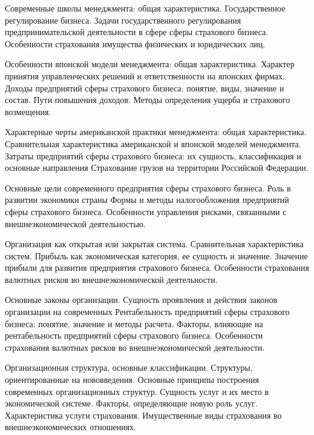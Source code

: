 \documentclass[
	11pt,
	a4paper,
	]
	{article}
\begin{document}
\bigskip

\noindent{} 
	{
		Современные школы менеджмента: общая характеристика.
	}{
		Государственное регулирование бизнеса. Задачи государственного регулирования предпринимательской деятельности в сфере сферы страхового бизнеса.
	}{
		Особенности страхования имущества физических и юридических лиц.
	}

\bigskip

\noindent{} 
	{
		Особенности японской модели менеджмента: общая характеристика. Характер принятия управленческих решений и ответственности на японских фирмах.
	}{
		Доходы предприятий сферы страхового бизнеса: понятие, виды, значение и состав. Пути повышения доходов.
	}{
		Методы определения ущерба и страхового возмещения.
	}

\bigskip

\noindent{} 
	{
		Характерные черты американской практики менеджмента: общая характеристика. Сравнительная характеристика американской и японской моделей менеджмента.
	}{
		Затраты предприятий сферы страхового бизнеса: их сущность, классификация и основные направления
	}{
		Страхование грузов на территории Российской Федерации.
	}

\bigskip

\noindent{} 
	{
		Основные цели современного предприятия сферы страхового бизнеса. Роль в развитии экономики страны
	}{
		Формы и методы налогообложения предприятий сферы страхового бизнеса.
	}{
		Особенности управления рисками, связанными с внешнеэкономической деятельностью.
	}

\bigskip

\noindent{} 
	{
		Организация как открытая или закрытая система. Сравнительная характеристика систем.
	}{
		Прибыль как экономическая категория, ее сущность и значение. Значение прибыли для развития предприятия страхового бизнеса.
	}{
		Особенности страхования валютных рисков во внешнеэкономической деятельности.
	}

\bigskip

\noindent{} 
	{
		Основные законы организации. Сущность проявления и действия законов организации на современных
	}{
		Рентабельность предприятий сферы страхового бизнеса: понятие, значение и методы расчета. Факторы, влияющие на рентабельность предприятий сферы страхового бизнеса.
	}{
		Особенности страхования валютных рисков во внешнеэкономической деятельности.
	}

\bigskip

\noindent{} 
	{
		Организационная структура, основные классификации. Структуры, ориентированные на нововведения. Основные принципы построения современных организационных структур.
	}{
		Сущность услуг и их место в экономической системе. Факторы, определяющие новую роль услуг. Характеристика услуги страхования.
	}{
		Имущественные виды страхования во внешнеэкономических отношениях.
	}
\end{document}
